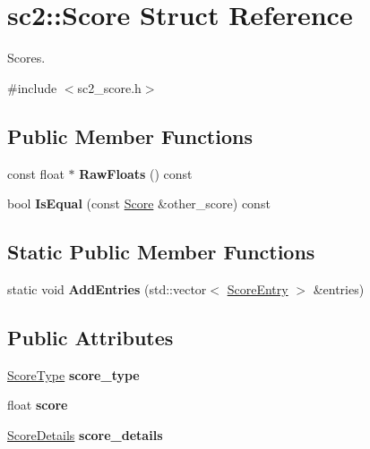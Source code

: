 \hypertarget{structsc2_1_1_score}{}\section{sc2\+:\+:Score Struct Reference}
\label{structsc2_1_1_score}


Scores.  




{\ttfamily \#include $<$sc2\+\_\+score.\+h$>$}

\subsection*{Public Member Functions}
\begin{DoxyCompactItemize}
\item 
\mbox{\label{structsc2_1_1_score_a26f5b7adac31f862c6188f406ce7894a}} 
const float $\ast$ {\bfseries Raw\+Floats} () const
\item 
\mbox{\label{structsc2_1_1_score_a673079c2e3409a261d4fb8f0041c33a9}} 
bool {\bfseries Is\+Equal} (const \hyperlink{structsc2_1_1_score}{Score} \&other\+\_\+score) const
\end{DoxyCompactItemize}
\subsection*{Static Public Member Functions}
\begin{DoxyCompactItemize}
\item 
\mbox{\label{structsc2_1_1_score_a3add288b1e757b796c3c9d8aea84549d}} 
static void {\bfseries Add\+Entries} (std\+::vector$<$ \hyperlink{structsc2_1_1_score_entry}{Score\+Entry} $>$ \&entries)
\end{DoxyCompactItemize}
\subsection*{Public Attributes}
\begin{DoxyCompactItemize}
\item 
\mbox{\label{structsc2_1_1_score_a8c496fcfb02bec665857145af888f9a4}} 
\hyperlink{sc2__score_8h_aa4e8dbe2d274f393f7afb290ba84657a}{Score\+Type} {\bfseries score\+\_\+type}
\item 
\mbox{\label{structsc2_1_1_score_a3b442ae1a9aa764c01907d41b09d015f}} 
float {\bfseries score}
\item 
\mbox{\label{structsc2_1_1_score_a338f9ea8f1a55673d108375f8492e88e}} 
\hyperlink{structsc2_1_1_score_details}{Score\+Details} {\bfseries score\+\_\+details}
\end{DoxyCompactItemize}
